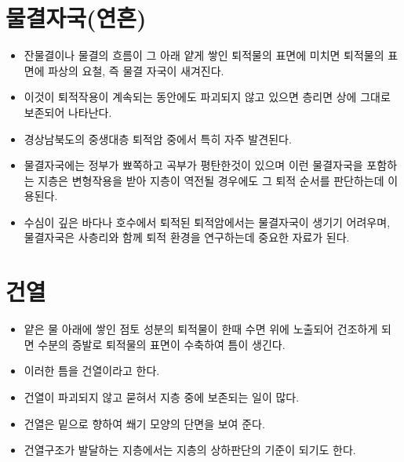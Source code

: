 \documentclass[12pt, a4paper, twoside]{book}
\begin{document}
	\section{물결자국(연흔)}


			\begin{itemize}[	topsep=0.0em, itemsep=0.0em, leftmargin=4em, labelsep=3em ] 
			\item	잔물결이나 물결의 흐름이 그 아래 얕게 쌓인 퇴적물의 표면에 미치면 퇴적물의 표면에 파상의 요철, 즉 물결 자국이 새겨진다.
			\item	이것이 퇴적작용이 계속되는 동안에도 파괴되지 않고 있으면 층리면 상에 그대로 보존되어 나타난다.
			\item	경상남북도의 중생대층 퇴적암 중에서 특히 자주 발견된다.
			\item	물결자국에는 정부가 뾰쪽하고 곡부가 평탄한것이 있으며 이런 물결자국을 포함하는 지층은 
					변형작용을 받아 지층이 역전될 경우에도 그 퇴적 순서를 판단하는데 이용된다.
			\item	수심이 깊은 바다나 호수에서 퇴적된 퇴적암에서는 물결자국이 생기기 어려우며, 
					물결자국은  사층리와 함께 퇴적 환경을 연구하는데 중요한 자료가 된다.
			\end{itemize}	







	\clearpage
	\section{건열}


			\begin{itemize}[	topsep=0.0em, itemsep=0.0em, leftmargin=4em, labelsep=3em ] 
			\item	얕은 물 아래에 쌓인 점토 성분의 퇴적물이 한때 수면 위에 노출되어 건조하게 되면 
					수분의 증발로 퇴적물의 표면이 수축하여 틈이 생긴다.
			\item	이러한 틈을 건열이라고 한다.
			\item	건열이 파괴되지 않고 묻혀서 지층 중에 보존되는 일이 많다.
			\item	건열은 밑으로 향하여 쐐기 모양의 단면을 보여 준다.
			\item	건열구조가 발달하는 지층에서는 지층의 상하판단의 기준이 되기도 한다.
			\end{itemize}	
\end{document}
